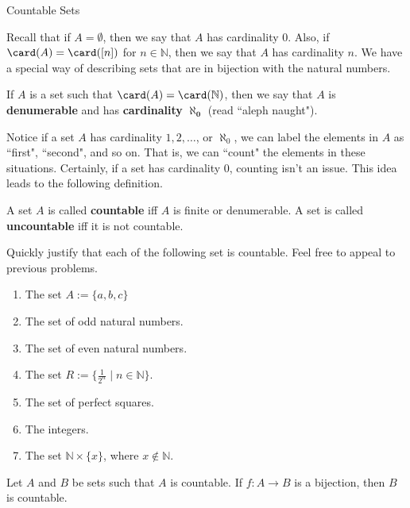 \begin{section}{Countable Sets}

Recall that if $A=\emptyset$, then we say that $A$ has cardinality 0.  Also, if $\card(A)=\card([n])$ for $n\in\mathbb{N}$, then we say that $A$ has cardinality $n$.  We have a special way of describing sets that are in bijection with the natural numbers.

\begin{definition}
If $A$ is a set such that $\card(A)=\card(\mathbb{N})$, then we say that $A$ is \textbf{denumerable} and has \textbf{cardinality} $\mathbf{\aleph_0}$ (read ``aleph naught").
\end{definition}

Notice if a set $A$ has cardinality $1,2,\ldots$, or $\aleph_0$, we can label the elements in $A$ as ``first", ``second", and so on.  That is, we can ``count" the elements in these situations. Certainly, if a set has cardinality 0, counting isn't an issue.  This idea leads to the following definition.

\begin{definition}\label{def:countable}
A set $A$ is called \textbf{countable} iff $A$ is finite or denumerable. A set is called \textbf{uncountable} iff it is not countable.
\end{definition}

\begin{problem}
Quickly justify that each of the following set is countable. Feel free to appeal to previous problems.
\begin{enumerate}[label=\textrm{(\alph*)}]
\item The set $A:=\{a,b,c\}$
\item The set of odd natural numbers.
\item The set of even natural numbers.
\item The set $R:=\{\frac{1}{2^n}\mid n\in \mathbb{N}\}$.
\item The set of perfect squares.
\item The integers.
\item The set $\mathbb{N}\times \{x\}$, where $x\notin \mathbb{N}$.
\end{enumerate}
\end{problem}

\begin{theorem}
Let $A$ and $B$ be sets such that $A$ is countable. If $f:A\to B$ is a bijection, then $B$ is countable.
\end{theorem}


\end{section}
